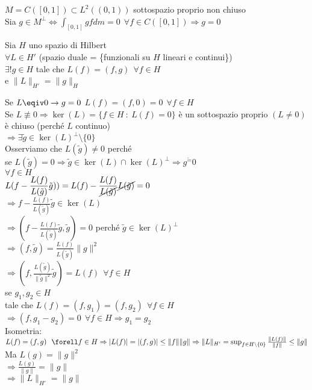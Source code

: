 \documentclass[12px]{article}
\begin{document}
	$M = C([0,1])\subset L^2((0,1))$ sottospazio proprio non chiuso\\
	Sia  $g\in M^\perp \Leftrightarrow \int_{[0,1]}gfdm = 0 \ \ \forall f\in C([0,1]) \Rightarrow g = 0$\\
	\begin{teo}
		Sia $H$ uno spazio di Hilbert\\
	$\forall L\in H'$ (spazio duale = \{funzionali su $H$ lineari e continui\}) \\
	$\exists !g\in H$ tale che  $L(f) = (f,g) \ \ \forall f\in H$\\
	e $\| L\|_{H'} = \|g\|_H$
	\end{teo}
	\begin{dimo}
		Se $L \eqiv 0 \rightarrow g = 0$ $ L(f) = (f,0) = 0 \ \ \forall f\in H$\\
		Se $L \not\equiv 0 \Rightarrow \ker(L) = \{f\in H\ :\ L(f) =0 \}$ è un sottospazio  proprio $(L \neq 0)$ è chiuso (perché  $L$ continuo)\\
		$ \Rightarrow  \exists \tilde g\in \ker(L)^\perp\setminus\{0\}$ \\
		Osserviamo che $L(\tilde g)\neq 0 $ perché\\
		se  $L(\tilde g) = 0 \Rightarrow  \tilde g\in \ker(L)\cap \ker(L)^\perp \Rightarrow  g^\tilde = 0$ \\
		$\forall f\in H$\\
		$\displaystyle L(f - \frac{L(f)}{L(\tilde g)}\tilde g))= L(f) - \frac{ L(f)}{\cancel{L(\tilde g)}}\cancel{L(\tilde g)} = 0$  \\
		$ \Rightarrow  f - \frac { L(f)}{L(\tilde g)}\tilde g\in \ker(L)$ \\
		$ \Rightarrow  (f - \frac { L(f)}{L(\tilde g)}\tilde g, \tilde g) = 0 $ perché $\tilde g\in \ker(L)^\perp$\\
		$ \Rightarrow (f,\tilde g) = \frac{L(f)}{L(\tilde g)}\|g\|^2$ \\
		$ \Rightarrow  (f,\frac{L(\tilde g)}{\|\tilde g\|^2}\tilde g) = L(f) \ \ \forall f\in H$ \\
		se $g_1,g_2\in H$\\
		tale che $L(f) = (f,g_1) = (f,g_2)\ \ \forall f\in H$\\
		$ \Rightarrow  (f,g_1 - g_2) = 0\ \ \forall f\in H \Rightarrow  g_1 = g_2$ \\
		Isometria:\\
		$L(f) = (f,g) \ \ \forell f\in H \Rightarrow |L(f)| = |(f,g)| \leq \|f\|\|g\| \Rightarrow  \|L\|_{H'} = \sup_{f\in H\setminus\{0\}}\frac{\|L(f)\|}{\|f\|}\leq \|g\|$ \\
		Ma $L(g) = \|g\|^2$\\
		$ \Rightarrow  \frac { L(g)}{\|g\|} = \|g\|$ \\
		$ \Rightarrow \|L\|_{H'} = \|g\|$ 
	\end{dimo}
\end{document}

